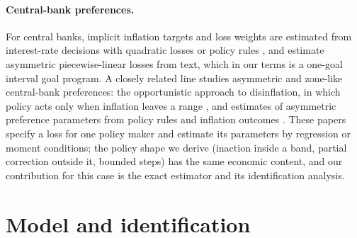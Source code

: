 \documentclass[11pt,a4paper]{article}
\theoremstyle{remark}\newtheorem{remark}{Remark}
\begin{document}
\paragraph{Central-bank preferences.} For central banks, implicit inflation targets and loss weights are estimated from interest-rate decisions with quadratic losses or policy rules \citep{taylor1993,clarida2000,svensson1997,dennis2006,favero2003,ozlale2003,ireland2007}, and \citet{shapiro2021} estimate asymmetric piecewise-linear losses from text, which in our terms is a one-goal interval goal program. A closely related line studies asymmetric and zone-like central-bank preferences: the opportunistic approach to disinflation, in which policy acts only when inflation leaves a range \citep{orphanides2002}, and estimates of asymmetric preference parameters from policy rules and inflation outcomes \citep{rugemurcia2003,surico2007,kilian2008}. These papers specify a loss for one policy maker and estimate its parameters by regression or moment conditions; the policy shape we derive (inaction inside a band, partial correction outside it, bounded steps) has the same economic content, and our contribution for this case is the exact estimator and its identification analysis.

\section{Model and identification}\label{sec:modelident}
\end{document}
